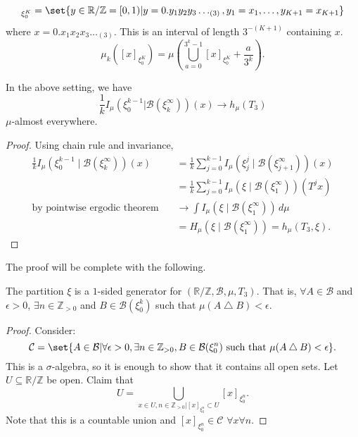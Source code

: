 \documentclass{article}
\newcommand{\B}{\mathcal{B}}
\newcommand{\sym}{\bigtriangleup}
\begin{document}
\begin{remark}
  \begin{equation*}
    [x]_{\xi_0^K} = \set{y \in \mathbb{R}/\mathbb{Z} = [0,1) | y = 0.y_1y_2y_3\dotsc_{(3)}, y_1=x_1 ,\dotsc, y_{K+1} = x_{K+1}}
  \end{equation*}
  where $x = 0.x_1 x_2 x_3 \dotsc_{(3)}$.
  This is an interval of length $3^{-(K+1)}$ containing $x$.
  \begin{equation*}
    \mu_k([x]_{\xi_0^K}) = \mu(\bigcup_{a=0}^{3^k-1} [x]_{\xi_0^K} + \frac{a}{3^k}).
  \end{equation*}
\end{remark}
\begin{lemma}
  In the above setting, we have
  \begin{equation*}
    \frac{1}{k} I_\mu(\xi_0^{k-1} | \B(\xi_k^\infty)) (x) \to h_\mu(T_3)
  \end{equation*}
  $\mu$-almost everywhere.
\end{lemma}
\begin{proof}
  Using chain rule and invariance,
  \begin{align*}
    \frac{1}{k} I_\mu(\xi_0^{k-1} \mid \B(\xi_k^\infty))(x) &= \frac{1}{k} \sum_{j=0}^{k-1} I_\mu (\xi_j^j \mid \B(\xi_{j+1}^\infty))(x) \\
                                                            &= \frac{1}{k} \sum_{j=0}^{k-1} I_\mu(\xi \mid \B(\xi_1^\infty))(T^j x) \\
    \text{by pointwise ergodic theorem} \quad &\to \int I_\mu(\xi \mid \B(\xi_1^\infty))\,d\mu \\
                                                            &= H_\mu(\xi \mid \B(\xi_1^\infty)) = h_\mu(T_3,\xi).
  \end{align*}
  \renewcommand{\qedsymbol}{}
\end{proof}
The proof will be complete with the following.
\begin{lemma}
  The partition $\xi$ is a $1$-sided generator for $(\mathbb{R}/\mathbb{Z}, \B,\mu,T_3)$. That is, $\forall A \in \B$ and $\epsilon > 0$, $\exists n \in \mathbb{Z}_{>0}$ and $B \in \B(\xi_0^k)$ such that $\mu(A \sym B) < \epsilon$.
\end{lemma}
\begin{proof}
  Consider:
  \begin{equation*}
    \mathcal{C} = \set{A \in \B | \forall \epsilon > 0, \exists n \in \mathbb{Z}_{>0}, B \in \B(\xi_0^n) \text{ such that } \mu(A \sym B) < \epsilon}.
  \end{equation*}
  This is a $\sigma$-algebra, so it is enough to show that it contains all open sets.
  Let $U \subseteq \mathbb{R}/\mathbb{Z}$ be open.
  Claim that
  \begin{equation*}
    U = \bigcup_{x \in U, n \in \mathbb{Z}_{>0} | [x]_{\xi_0^n} \subset U} [x]_{\xi_0^n}.
  \end{equation*}
  Note that this is a countable union and $[x]_{\xi_0^n} \in \mathcal{C}$ $\forall x \forall n$.
\end{proof}
\end{document}
